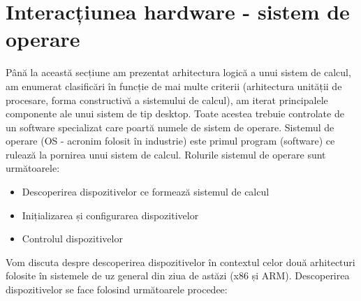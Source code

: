 \section{Interacțiunea hardware - sistem de operare}
\label{sec:hardware-interact}

Până la această secțiune am prezentat arhitectura logică a unui sistem de
calcul, am enumerat clasificări în funcție de mai multe criterii (arhitectura
unității de procesare, forma constructivă a sistemului de calcul), am iterat
principalele componente ale unui sistem de tip desktop. Toate acestea trebuie
controlate de un software specializat care poartă numele de sistem de operare.
Sistemul de operare (OS - acronim folosit în industrie) este primul program
(software) ce rulează la pornirea unui sistem de calcul. Rolurile sistemul de
operare sunt următoarele:

\begin{itemize}
	\item Descoperirea dispozitivelor ce formează sistemul de calcul
	\item Inițializarea și configurarea dispozitivelor
	\item Controlul dispozitivelor
\end{itemize}

Vom discuta despre descoperirea dispozitivelor în contextul celor două
arhitecturi folosite în sistemele de uz general din ziua de astăzi (x86 și ARM).
Descoperirea dispozitivelor se face folosind următoarele procedee:

